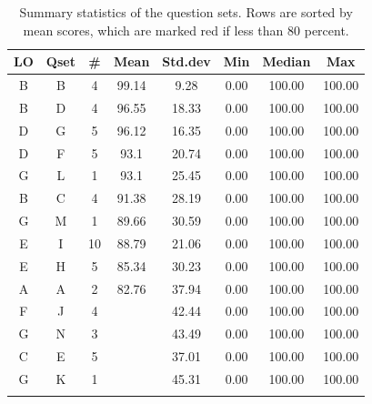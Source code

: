 \documentclass[12pt,english,nohyper]{tufte-handout}\usepackage[]{graphicx}\usepackage[]{color}
\begin{document}
\begin{fullwidth}
\makeatletter\setlength\hsize{\@tufte@fullwidth}\makeatother
\begin{longtable}{cc|ccc|ccc}
  \hline
LO & Qset & \# & Mean & Std.dev & Min & Median & Max \\ 
  \hline
B & B &   4 & 99.14 & 9.28 & 0.00 & 100.00 & 100.00 \\ 
  B & D &   4 & 96.55 & 18.33 & 0.00 & 100.00 & 100.00 \\ 
  D & G &   5 & 96.12 & 16.35 & 0.00 & 100.00 & 100.00 \\ 
  D & F &   5 & 93.1 & 20.74 & 0.00 & 100.00 & 100.00 \\ 
  G & L &   1 & 93.1 & 25.45 & 0.00 & 100.00 & 100.00 \\ 
  B & C &   4 & 91.38 & 28.19 & 0.00 & 100.00 & 100.00 \\ 
  G & M &   1 & 89.66 & 30.59 & 0.00 & 100.00 & 100.00 \\ 
  E & I &  10 & 88.79 & 21.06 & 0.00 & 100.00 & 100.00 \\ 
  E & H &   5 & 85.34 & 30.23 & 0.00 & 100.00 & 100.00 \\ 
  A & A &   2 & 82.76 & 37.94 & 0.00 & 100.00 & 100.00 \\ 
  F & J &   4 & \color{red}{76.72} & 42.44 & 0.00 & 100.00 & 100.00 \\ 
  G & N &   3 & \color{red}{75} & 43.49 & 0.00 & 100.00 & 100.00 \\ 
  C & E &   5 & \color{red}{74.57} & 37.01 & 0.00 & 100.00 & 100.00 \\ 
  G & K &   1 & \color{red}{71.55} & 45.31 & 0.00 & 100.00 & 100.00 \\ 
   \hline
\hline
\caption{Summary statistics of the question sets. Rows are sorted by mean scores, which are marked red if less than 80 percent.} 
\label{tab:QuestionSet_summary}
\end{longtable}

\end{fullwidth}
\end{document}
